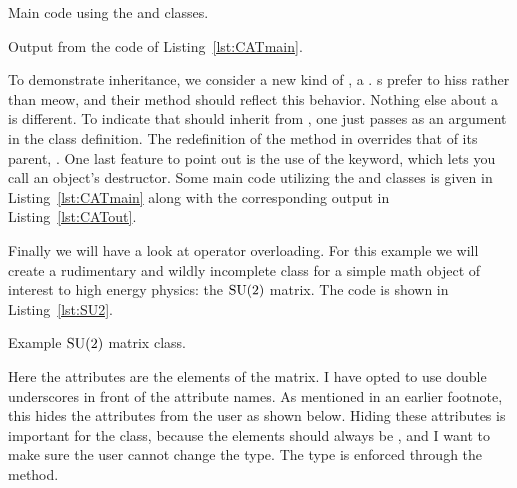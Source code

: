 \begin{code*}
\caption{Main code using the  and  classes.}
\label{lst:CATmain}
\end{code*}
\begin{code*}
\caption{Output from the code of Listing~\ref{lst:CATmain}.}
\label{lst:CATout}
\end{code*}

To demonstrate inheritance, we consider a new kind of , a
. s prefer to hiss rather than meow, and
their  method should reflect this behavior. Nothing else
about a  is different. To indicate that 
should inherit from , one just passes  as an argument
in the class definition.
The redefinition of the  method
in  overrides that of its parent, . One last
feature to point out is the use of the  keyword, which lets you
call an object's destructor.
Some main code utilizing the  and  classes
is given in Listing~\ref{lst:CATmain} along with the
corresponding output in Listing~\ref{lst:CATout}.

Finally we will have a look at operator overloading. For this example we
will create a rudimentary and wildly incomplete class for a simple math 
object of interest to high energy physics: the $\operatorname{SU}(2)$ matrix.
The code is shown in Listing~\ref{lst:SU2}.

\begin{code*}
\caption{Example $\operatorname{SU}(2)$ matrix class.}
\label{lst:SU2}
\end{code*}

Here the attributes are the elements of the matrix. 
I have opted to use double underscores \ff{\_\_} in front of
the attribute names. As mentioned in an earlier footnote, this hides the
attributes from the user as shown below.
Hiding these attributes is important for the  class, because the
elements should always be , and I want to make sure the
user cannot change the type. The  type is
enforced through the  method.

